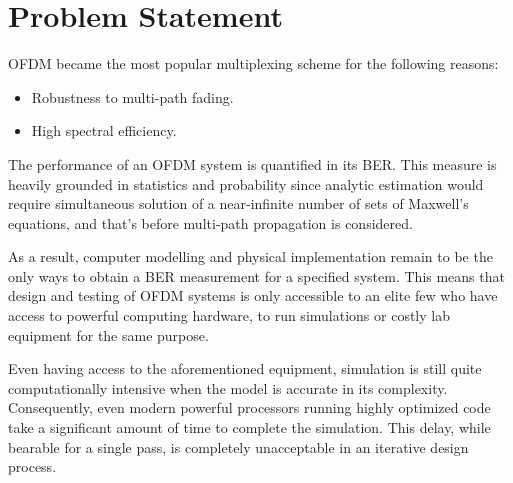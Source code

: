 \section{Problem Statement}
\gls{OFDM} became the most popular multiplexing scheme for the following reasons:
\begin{itemize}
	\item Robustness to multi-path fading.
	\item High spectral efficiency.
\end{itemize}
The performance of an \gls{OFDM} system is quantified in its \gls{BER}. This measure is heavily grounded in statistics and probability since analytic estimation would require simultaneous solution of a near-infinite number of sets of Maxwell's equations, and that's before multi-path propagation is considered.

As a result, computer modelling and physical implementation remain to be the only ways to obtain a \gls{BER} measurement for a specified system. This means that design and testing of \gls{OFDM} systems is only accessible to an elite few who have access to powerful computing hardware, to run simulations or costly lab equipment for the same purpose.

Even having access to the aforementioned equipment, simulation is still quite computationally intensive when the model is accurate in its complexity. Consequently, even modern powerful processors running highly optimized code take a significant amount of time to complete the simulation. This delay, while bearable for a single pass, is completely unacceptable in an iterative design process.

